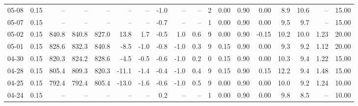 \begin{threeparttable}
{\begin{tabular}{lrrrrrrrrrrrrrrrrr}
  05-08 &     0.15 &    -- &    -- &    -- &         -- &             -- &                      -1.0 &                       -- &                  -- &              2 &       0.00 &      0.90 &           0.00 &              8.9 &                10.6 &              -- &                  15.00 \\
  05-07 &     0.15 &    -- &    -- &    -- &         -- &             -- &                      -0.7 &                       -- &                  -- &              1 &       0.00 &      0.90 &           0.00 &              9.5 &                 9.7 &              -- &                  15.00 \\
  05-02 &     0.15 & 840.8 & 840.8 & 827.0 &       13.8 &            1.7 &                      -0.5 &                      1.0 &                 0.6 &              9 &       0.00 &      0.90 &          -0.15 &             10.2 &                10.0 &            1.23 &                  20.00 \\
  05-01 &     0.15 & 828.6 & 832.3 & 840.8 &       -8.5 &           -1.0 &                      -0.8 &                     -1.0 &                 0.3 &              9 &       0.15 &      0.90 &           0.00 &              9.3 &                 9.2 &            1.12 &                  20.00 \\
  04-30 &     0.15 & 820.3 & 824.2 & 828.6 &       -4.5 &           -0.5 &                      -0.6 &                     -1.0 &                 0.2 &              0 &       0.15 &      0.90 &           0.00 &             10.3 &                 9.4 &            1.22 &                  15.00 \\
  04-28 &     0.15 & 805.4 & 809.3 & 820.3 &      -11.1 &           -1.4 &                      -0.4 &                     -1.0 &                 0.4 &              9 &       0.15 &      0.90 &           0.15 &             12.2 &                 9.4 &            1.48 &                  15.00 \\
  04-25 &     0.15 & 792.4 & 792.4 & 805.4 &      -13.0 &           -1.6 &                      -0.6 &                     -1.0 &                 0.5 &              9 &       0.00 &      0.90 &           0.00 &             10.0 &                 9.2 &            1.24 &                  10.00 \\
  04-24 &     0.15 &    -- &    -- &    -- &         -- &             -- &                       0.2 &                       -- &                  -- &              1 &       0.00 &      0.90 &           0.00 &              9.8 &                 8.5 &              -- &                  10.00 \\

\end{tabular}}
\end{threeparttable}
